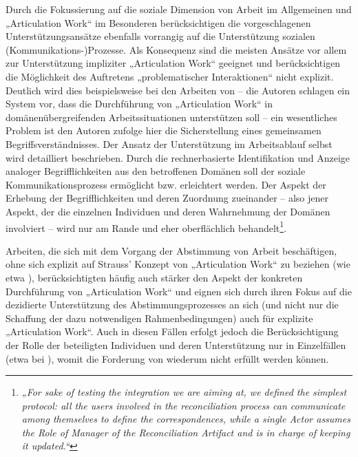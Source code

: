 Durch die Fokussierung auf die soziale Dimension von Arbeit im Allgemeinen und „Articulation Work“ im Besonderen berücksichtigen die vorgeschlagenen Unterstützungsansätze ebenfalls vorrangig auf die Unterstützung sozialen (Kommunikations-)Prozesse. Als Konsequenz sind die meisten Ansätze vor allem zur Unterstützung impliziter „Articulation Work“ geeignet und berücksichtigen die Möglichkeit des Auftretens „problematischer Interaktionen“ nicht explizit. Deutlich wird dies beispielsweise bei den Arbeiten von \citep{Sarini02} -- die Autoren schlagen ein System vor, dass die Durchführung von „Articulation Work“ in domänenübergreifenden Arbeitssituationen unterstützen soll -- ein wesentliches Problem ist den Autoren zufolge hier die Sicherstellung eines gemeinsamen Begriffsverständnisses. Der Ansatz der Unterstützung im Arbeitsablauf selbst wird detailliert beschrieben. Durch die rechnerbasierte Identifikation und Anzeige analoger Begrifflichkeiten aus den betroffenen Domänen soll der soziale Kommunikationsprozess ermöglicht bzw. erleichtert werden. Der Aspekt der Erhebung der Begrifflichkeiten und deren Zuordnung zueinander -- also jener Aspekt, der die einzelnen Individuen und deren Wahrnehmung der Domänen involviert -- wird nur am Rande und eher oberflächlich behandelt\footnote{\emph{„For sake of testing the integration we are aiming at, we defined the simplest protocol: all the users involved in the reconciliation process can communicate among themselves to define the correspondences, while a single Actor assumes the Role of Manager of the Reconciliation Artifact and is in charge of keeping it updated.“}\citep[][S. 10]{Sarini02}}. 

Arbeiten, die sich mit dem Vorgang der Abstimmung von Arbeit beschäftigen, ohne sich explizit auf Strauss' Konzept von „Articulation Work“ zu beziehen (wie etwa \citep{Jorgensen04}), berücksichtigten häufig auch stärker den Aspekt der konkreten Durchführung von „Articulation Work“ und eignen sich durch ihren Fokus auf die dezidierte Unterstützung des Abstimmungsprozesses an sich (und nicht nur die Schaffung der dazu notwendigen Rahmenbedingungen) auch für explizite „Articulation Work“. Auch in diesen Fällen erfolgt jedoch die Berücksichtigung der Rolle der beteiligten Individuen und deren Unterstützung nur in Einzelfällen (etwa bei \citet{Herrmann02}), womit die Forderung von \citet{Grudin88} wiederum nicht erfüllt werden können.

